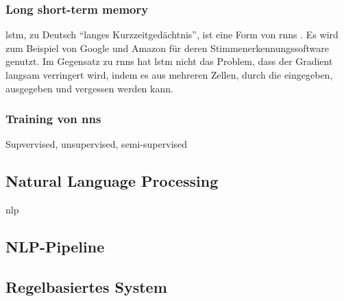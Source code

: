 \subsubsection{Long short-term memory}

\ac{lstm}, zu Deutsch \enquote{langes Kurzzeitgedächtnis}, ist eine Form von \acp{rnn} \citep{lstm}.
Es wird zum Beispiel von Google und Amazon für deren Stimmenerkennungssoftware genutzt.
Im Gegensatz zu \acp{rnn} hat \ac{lstm} nicht das Problem, dass der Gradient langsam verringert wird,
indem es aus mehreren Zellen, durch die eingegeben, ausgegeben und vergessen werden kann.

\subsubsection{Training von \acp{nn}}

Supvervised, unsupervised, semi-supervised

\subsection{Natural Language Processing}

\acf{nlp}

\subsection{NLP-Pipeline}



\subsection{Regelbasiertes System}
